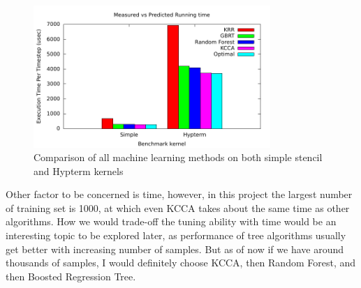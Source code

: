 \begin{figure}[h]
\centering
\includegraphics[width=0.8\textwidth]{./images/compare_all.pdf}
\caption{Comparison of all machine learning methods on both simple stencil and Hypterm kernels}
\label{fig:compare_all}
\end{figure}

Other factor to be concerned is time, however, in this project the largest number of training set is 1000, at which even KCCA takes about the same time as other algorithms. How we would trade-off the tuning ability with time would be an interesting topic to be explored later, as performance of tree algorithms usually get better with increasing number of samples. But as of now if we have around thousands of samples, I would definitely choose KCCA, then Random Forest, and then Boosted Regression Tree.
